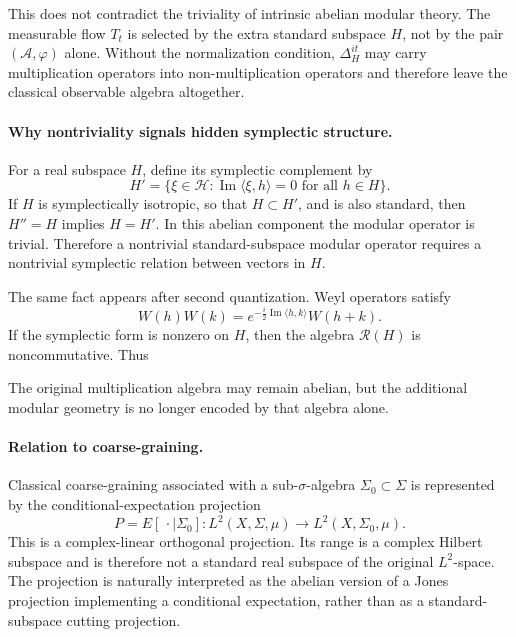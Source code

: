 \documentclass[a4paper,11pt]{article}
\theoremstyle{definition}
\newcommand{\cH}{\mathcal{H}}
\begin{document}
This does not contradict the triviality of intrinsic abelian modular theory. The measurable flow \(T_t\) is selected by the extra standard subspace \(H\), not by the pair \((\mathcal{A},\varphi)\) alone. Without the normalization condition, \(\Delta_H^{it}\) may carry multiplication operators into non-multiplication operators and therefore leave the classical observable algebra altogether.

\paragraph{Why nontriviality signals hidden symplectic structure.}
For a real subspace \(H\), define its symplectic complement by
\[
    H'=\{\xi\in\cH:\operatorname{Im}\langle\xi,h\rangle=0
    \text{ for all }h\in H\}.
\]
If \(H\) is symplectically isotropic, so that \(H\subset H'\), and is also standard, then \(H''=H\) implies \(H=H'\). In this abelian component the modular operator is trivial. Therefore a nontrivial standard-subspace modular operator requires a nontrivial symplectic relation between vectors in \(H\).

The same fact appears after second quantization. Weyl operators satisfy
\[
    W(h)W(k)
    =e^{-\frac{i}{2}\operatorname{Im}\langle h,k\rangle}W(h+k).
\]
If the symplectic form is nonzero on \(H\), then the algebra \(\mathcal{R}(H)\) is noncommutative. Thus
\begin{center}
\end{center}
The original multiplication algebra may remain abelian, but the additional modular geometry is no longer encoded by that algebra alone.

\paragraph{Relation to coarse-graining.}
Classical coarse-graining associated with a sub-\(\sigma\)-algebra \(\Sigma_0\subset\Sigma\) is represented by the conditional-expectation projection
\[
    P=E[\,\cdot\mid\Sigma_0]:L^2(X,\Sigma,\mu)\to
    L^2(X,\Sigma_0,\mu).
\]
This is a complex-linear orthogonal projection. Its range is a complex Hilbert subspace and is therefore not a standard real subspace of the original \(L^2\)-space. The projection is naturally interpreted as the abelian version of a Jones projection implementing a conditional expectation, rather than as a standard-subspace cutting projection.
\end{document}
